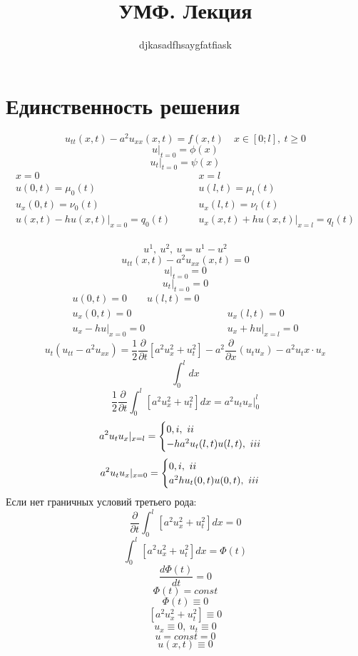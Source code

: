 \documentclass[a4paper]{article}
\begin{document}
\title{УМФ. Лекция}
\author{djkasadfhsaygfatfiask}
\maketitle
\section*{\centering Единственность решения}

\begin{equation}
    u_{tt}(x,t) - a^2 u_{xx}(x,t) = f(x,t) \quad x \in [0; l], \ t \geq 0
\end{equation}
\begin{equation}
    u |_{t=0} = \phi(x)
\end{equation}
\begin{equation}
    u_t |_{t=0} = \psi(x)
\end{equation}
\begin{equation}
\begin{aligned}
    x = 0 &\qquad x = l\\
    u(0, t) = \mu_0(t) &\qquad u(l,t) = \mu_l(t)\\
    u_x(0, t) = \nu_0(t) &\qquad u_x(l,t) = \nu_l(t)\\
    u(x,t) - h u(x,t) |_{x=0} = q_0(t) &\qquad u_x(x,t) + h u(x,t) |_{x=l} = q_l(t)\\
\end{aligned}
\end{equation}

\[
    u^{1}, \ u^2, \ u = u^{1} - u^2
\]
\[
    u_{t t}(x,t) - a^2u_{xx}(x,t) = 0
\]
\[
    u|_{t=0} = 0
\]
\[
    u_{t}|_{t=0} = 0
\]
\[
    \begin{aligned}
        u(0,t) = 0 \qquad u(l,t) = 0 \\
        u_x(0,t) = 0 &\qquad u_x(l,t) = 0 \\
        u_x - hu|_{x=0} = 0 &\qquad u_x + hu|_{x=l} = 0
    \end{aligned}
\]
\[
    u_t(u_{t t} - a^2 u_{xx}) = \frac{1}{2} \frac{\partial}{\partial t}[a^2 u^2
_x + u_t^2] - a^2 \frac{\partial}{\partial x} (u_t u_x) - a^2 u_tx \cdot u_x 
\]
\[
    \int_{0}^{l} dx
\]
\[
    \frac{1}{2} \frac{\partial}{\partial t} \int_{0}^{l} [a^2 u_x^2 + u_t^2]dx =
    a^2 u_t u_x |_{0}^{l}
\]
\[
    a^2 u_t u_x |_{x=l} = 
    \begin{cases}
        0, \romannumeral 1, \ \romannumeral 2 \\
        -ha^2 u_t(l,t) u(l,t), \ \romannumeral 3
    \end{cases}
\]
\[
    a^2 u_t u_x |_{x=0} = 
    \begin{cases}
        0, \romannumeral 1, \ \romannumeral 2 \\
        a^2h u_t(0,t) u(0,t), \ \romannumeral 3
    \end{cases}
\]
Если нет граничных условий третьего рода:
\[
    \frac{\partial}{\partial t} \int_{0}^{l} [a^2u^2_x + u_t^2]dx = 0
\]
\[
    \int_{0}^{l} [a^2u^2_x + u_t^2]dx = \Phi(t)
\]
\[
    \frac{d\Phi(t)}{dt} = 0
\]
\[
    \Phi(t) = const
\]
\[
    \Phi(t) \equiv 0
\]
\[
    [a^2u^2_x + u_t^2] \equiv 0
\]
\[
    u_x \equiv 0, \ u_t \equiv 0
\]
\[
    u = const = 0
\]
\[
    u(x,t) \equiv 0
\]
\end{document}

